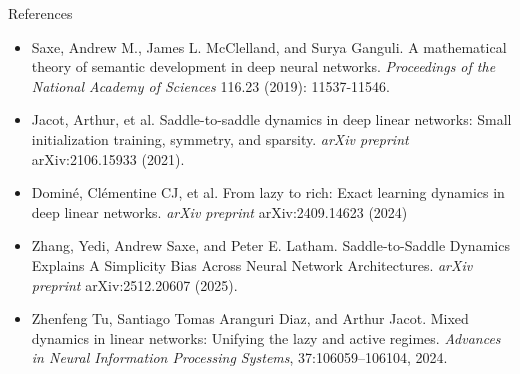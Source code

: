 \documentclass[aspectratio=169,11pt]{beamer}
\begin{document}

\begin{frame}{References}
    \begin{itemize}
        \item Saxe, Andrew M., James L. McClelland, and Surya Ganguli. A mathematical theory of semantic development in deep neural networks. \textit{Proceedings of the National Academy of Sciences} 116.23 (2019): 11537-11546.
        \item Jacot, Arthur, et al. Saddle-to-saddle dynamics in deep linear networks: Small initialization training, symmetry, and sparsity. \textit{arXiv preprint} arXiv:2106.15933 (2021).
        \item Dominé, Clémentine CJ, et al. From lazy to rich: Exact learning dynamics in deep linear networks. \textit{arXiv preprint} arXiv:2409.14623 (2024)
        \item Zhang, Yedi, Andrew Saxe, and Peter E. Latham. Saddle-to-Saddle Dynamics Explains A Simplicity Bias Across Neural Network Architectures. \textit{arXiv preprint} arXiv:2512.20607 (2025).
        \item Zhenfeng Tu, Santiago Tomas Aranguri Diaz, and Arthur Jacot. Mixed dynamics
in linear networks: Unifying the lazy and active regimes. \textit{Advances in Neural
Information Processing Systems}, 37:106059–106104, 2024.
    \end{itemize}
\end{frame}
\end{document}
